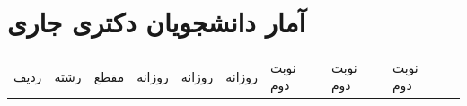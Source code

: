 \documentclass[
  letterpaper,
  DIV=11,
  numbers=noendperiod]{scrreprt}
\newcounter{none} %
\begin{document}
\section{آمار دانشجویان دکتری
جاری}\label{ux622ux645ux627ux631-ux62fux627ux646ux634ux62cux648ux6ccux627ux646-ux62fux6a9ux62aux631ux6cc-ux62cux627ux631ux6cc}

{\def\LTcaptype{none} %
\begin{longtable}[]{@{}
  >{\raggedright\arraybackslash}p{}
  >{\raggedright\arraybackslash}p{}
  >{\raggedright\arraybackslash}p{}
  >{\raggedright\arraybackslash}p{}
  >{\raggedright\arraybackslash}p{}
  >{\raggedright\arraybackslash}p{}
  >{\raggedright\arraybackslash}p{}
  >{\raggedright\arraybackslash}p{}
  >{\raggedright\arraybackslash}p{}
  >{\raggedright\arraybackslash}p{}@{}}
\toprule\noalign{}
\begin{minipage}[b]{\linewidth}\raggedright
ردیف
\end{minipage} & \begin{minipage}[b]{\linewidth}\raggedright
رشته
\end{minipage} & \begin{minipage}[b]{\linewidth}\raggedright
مقطع
\end{minipage} & \begin{minipage}[b]{\linewidth}\raggedright
روزانه
\end{minipage} & \begin{minipage}[b]{\linewidth}\raggedright
روزانه
\end{minipage} & \begin{minipage}[b]{\linewidth}\raggedright
روزانه
\end{minipage} & \begin{minipage}[b]{\linewidth}\raggedright
نوبت دوم
\end{minipage} & \begin{minipage}[b]{\linewidth}\raggedright
نوبت دوم
\end{minipage} & \begin{minipage}[b]{\linewidth}\raggedright
نوبت دوم
\end{minipage} & \begin{minipage}[b]{\linewidth}\raggedright

\end{minipage}
\end{longtable}}
\end{document}
